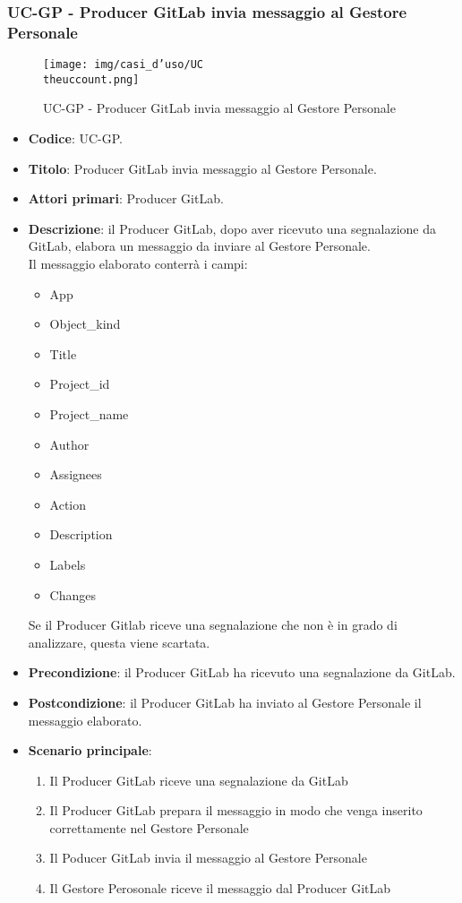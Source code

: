 \subsubsection{UC\theuccount-GP - Producer GitLab invia messaggio al Gestore Personale}
	\begin{figure}[H]
		\centering
		\texttt{[image: img/casi\_d'uso/UC\\theuccount.png]}\\
		\caption{UC\theuccount-GP - Producer GitLab invia messaggio al Gestore Personale}
	\end{figure}
	\begin{itemize}
		\item \textbf{Codice}: UC\theuccount-GP.
		\item \textbf{Titolo}: Producer GitLab invia messaggio al Gestore Personale.
		\item \textbf{Attori primari}: Producer GitLab.
		\item \textbf{Descrizione}: il Producer GitLab, dopo aver ricevuto una segnalazione da GitLab, elabora un messaggio da inviare al Gestore Personale. \\ Il messaggio elaborato conterrà i campi:
		\begin{itemize}
			\item App
			\item Object\_kind
			\item Title
			\item Project\_id
			\item Project\_name
			\item Author
			\item Assignees
			\item Action
			\item Description
			\item Labels
			\item Changes
		\end{itemize}
        Se il Producer Gitlab riceve una segnalazione che non è in grado di analizzare, questa viene scartata.
		\item \textbf{Precondizione}: il Producer GitLab ha ricevuto una segnalazione da GitLab.
		\item \textbf{Postcondizione}: il Producer GitLab ha inviato al Gestore Personale il messaggio elaborato.
		\item \textbf{Scenario principale}:
		\begin{enumerate}
			\item Il Producer GitLab riceve una segnalazione da GitLab
			\item Il Producer GitLab prepara il messaggio in modo che venga inserito correttamente nel Gestore Personale
			\item Il Poducer GitLab invia il messaggio al Gestore Personale
            \item Il Gestore Perosonale riceve il messaggio dal Producer GitLab
		\end{enumerate}
	\end{itemize}

